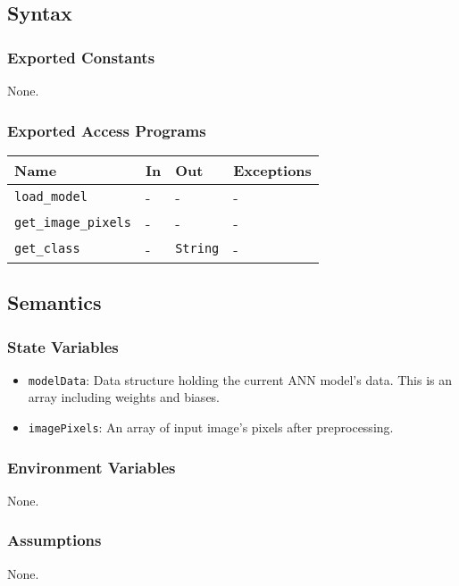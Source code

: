 \documentclass[12pt, titlepage]{article}
\def\code#1{\texttt{#1}}
\begin{document}
\subsection{Syntax}

\subsubsection{Exported Constants}
None.

\subsubsection{Exported Access Programs}

\begin{center}
\begin{tabular}{p{3cm} p{4cm} p{4cm} p{2cm}}
\hline
\textbf{Name} & \textbf{In} & \textbf{Out} & \textbf{Exceptions} \\
\hline
\code{load\_model} & - & - & - \\
\code{get\_image\_pixels} & - & - & - \\
\code{get\_class} & - & \code{String} &  -\\
\hline
\end{tabular}
\end{center}

\subsection{Semantics}

\subsubsection{State Variables}
\begin{itemize}
  \item \code{modelData}: Data structure holding the current ANN model's data. 
  This is an array including weights and biases.
  \item \code{imagePixels}: An array of input image's pixels after preprocessing.
\end{itemize}

\subsubsection{Environment Variables}
None.

\subsubsection{Assumptions}
None.
\end{document}
